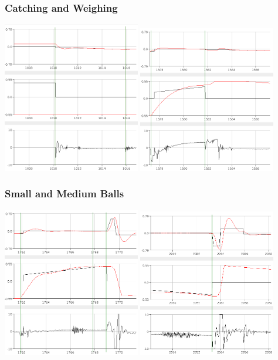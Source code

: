 \documentclass[
compress]
{beamer}
\begin{document}
\begin{frame}
\frametitle{Catching and Weighing}
\centering
\includegraphics[width=0.45\textwidth]{figures/topickupposition-crop.png}
\hspace{1em}
\includegraphics[width=0.45\textwidth]{figures/weighanddroplargeball-crop.png}
\end{frame}

\begin{frame}
\frametitle{Small and Medium Balls}
\centering
\includegraphics[width=0.45\textwidth]{figures/weighandthrowsmallball-crop.png}
\hspace{1em}
\includegraphics[width=0.45\textwidth]{figures/throwmediumball-crop.png}
\end{frame}
\end{document}
